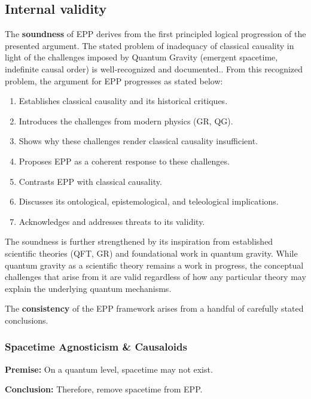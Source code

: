 \documentclass{article}
\begin{document}
\subsection{Internal validity}
\label{sec:validity_internal}

The \textbf{soundness} of EPP derives from the first principled logical progression of the presented argument. The stated problem of inadequacy of classical causality in light of the challenges imposed by Quantum Gravity (emergent spacetime, indefinite causal order) is well-recognized and documented\cite{MriniHardyIndefinite}.. From this recognized problem, the argument for EPP progresses as stated below:

\begin{enumerate}
    \item Establishes classical causality and its historical critiques.
    \item Introduces the challenges from modern physics (GR, QG).
    \item Shows why these challenges render classical causality insufficient.
    \item Proposes EPP as a coherent response to these challenges.
    \item Contrasts EPP with classical causality.
    \item Discusses its ontological, epistemological, and teleological implications.
    \item Acknowledges and addresses threats to its validity.
\end{enumerate}

The soundness is further strengthened by its inspiration from established scientific theories (QFT, GR) and foundational work in quantum gravity. While quantum gravity as a scientific theory remains a work in progress, the conceptual challenges that arise from it are valid regardless of how any particular theory may explain the underlying quantum mechanisms.

\newpage

The \textbf{consistency} of the EPP framework arises from a handful of carefully stated conclusions.

\subsubsection{Spacetime Agnosticism \& Causaloids}

\textbf{Premise:} On a quantum level, spacetime may not exist.

\textbf{Conclusion:} Therefore, remove spacetime from EPP.
\end{document}
